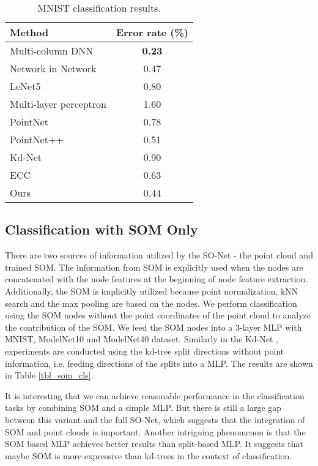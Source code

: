 \documentclass[10pt,twocolumn,letterpaper]{article}
\begin{document}
\begin{table}[h]
\centering
\begin{tabular}{lc}
\hline
Method                 & Error rate (\%) \\ \hline
Multi-column DNN \cite{ciregan2012multi}       & \textbf{0.23}    \\
Network in Network \cite{lin2013network}     & 0.47    \\
LeNet5 \cite{lecun1998gradient}                 & 0.80    \\
Multi-layer perceptron \cite{simard2003best} & 1.60    \\ 
\hline
PointNet \cite{qi2016pointnet}               & 0.78    \\
PointNet++ \cite{qi2017pointnet++}             & 0.51    \\
Kd-Net \cite{klokov2017escape}                 & 0.90    \\
ECC \cite{simonovsky2017dynamic}                    & 0.63    \\ 
\hline
Ours                   & 0.44    \\ 
\hline
\end{tabular}
\caption{MNIST classification results.}
\label{tbl_mnist}
\end{table}



\subsection{Classification with SOM Only} 
There are two sources of information utilized by the SO-Net - the point cloud and trained SOM. The information from SOM is explicitly used when the nodes are concatenated with the node features at the beginning of node feature extraction. Additionally, the SOM is implicitly utilized because point normalization, kNN search and the max pooling are based on the nodes.
We perform classification using the SOM nodes without the point coordinates of the point cloud to analyze the contribution of the SOM. 
We feed the SOM nodes into a 3-layer MLP with MNIST, ModelNet10 and ModelNet40 dataset. Similarly in the Kd-Net \cite{klokov2017escape}, experiments are conducted using the kd-tree split directions without point information, i.e. feeding directions of the splits into a MLP. The results are shown in Table \ref{tbl_som_cls}.

It is interesting that we can achieve reasonable performance in the classification tasks by
combining SOM and a simple MLP. But there is still a large gap between this variant and the full SO-Net, which suggests that the integration of SOM and point clouds is important. Another intriguing phenomenon is that the SOM based MLP achieves better results than split-based MLP. It suggests that maybe SOM is more expressive than kd-trees in the context of classification.
\end{document}
